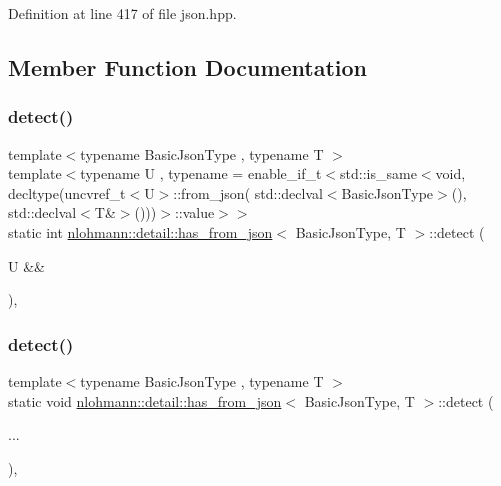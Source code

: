 Definition at line 417 of file json.\+hpp.



\subsection{Member Function Documentation}
\mbox{\label{structnlohmann_1_1detail_1_1has__from__json_a94e93c638429df773f948f5243fd304b}} 
\subsubsection{\texorpdfstring{detect()}{detect()}\hspace{0.1cm}{\footnotesize\ttfamily [1/2]}}
{\footnotesize\ttfamily template$<$typename Basic\+Json\+Type , typename T $>$ \\
template$<$typename U , typename  = enable\+\_\+if\+\_\+t$<$std\+::is\+\_\+same$<$void, decltype(uncvref\+\_\+t$<$\+U$>$\+::from\+\_\+json(                 std\+::declval$<$\+Basic\+Json\+Type$>$(), std\+::declval$<$\+T\&$>$()))$>$\+::value$>$$>$ \\
static int \hyperlink{structnlohmann_1_1detail_1_1has__from__json}{nlohmann\+::detail\+::has\+\_\+from\+\_\+json}$<$ Basic\+Json\+Type, T $>$\+::detect (\begin{DoxyParamCaption}\item[{U \&\&}]{ }\end{DoxyParamCaption})\hspace{0.3cm}{\ttfamily [static]}, {\ttfamily [private]}}

\mbox{\label{structnlohmann_1_1detail_1_1has__from__json_a6894294c2b238bd02364ba1943e759dd}} 
\subsubsection{\texorpdfstring{detect()}{detect()}\hspace{0.1cm}{\footnotesize\ttfamily [2/2]}}
{\footnotesize\ttfamily template$<$typename Basic\+Json\+Type , typename T $>$ \\
static void \hyperlink{structnlohmann_1_1detail_1_1has__from__json}{nlohmann\+::detail\+::has\+\_\+from\+\_\+json}$<$ Basic\+Json\+Type, T $>$\+::detect (\begin{DoxyParamCaption}\item[{}]{... }\end{DoxyParamCaption})\hspace{0.3cm}{\ttfamily [static]}, {\ttfamily [private]}}



